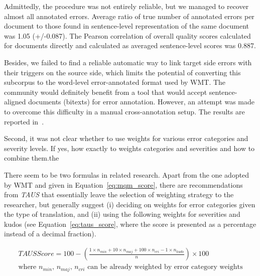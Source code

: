 Admittedly, the procedure was not entirely reliable, but we managed to recover almost all annotated errors. Average ratio of true number of annotated errors per document to those found in sentence-level representation of the same document was 1.05 (+/-0.087). The Pearson correlation of overall quality scores calculated for documents directly and calculated as averaged sentence-level scores was 0.887.

Besides, we failed to find a reliable automatic way to link target side errors with their triggers on the source side, which limits the potential of converting this subcorpus to the word-level error-annotated format used by WMT. 
The community would definitely benefit from a tool that would accept sentence-aligned documents (bitexts) for error annotation.  
However, an attempt was made to overcome this difficulty in a manual cross-annotation setup. The results are reported in~\citet{Kunilovskaya2022err}.

Second, it was not clear whether to use weights for various error categories and severity levels. If yes, how exactly to weights categories and severities and how to combine them.the 
 
There seem to be two formulas in related research. Apart from the one adopted by WMT and given in Equation~\ref{eq:mqm_score}, there are recommendations from \textit{TAUS} that essentially leave the selection of weighting strategy to the researcher, but generally suggest (i) deciding on weights for error categories given the type of translation, and (ii) using the following weights for severities and kudos (see Equation~\ref{eq:taus_score}, where the score is presented as a percentage instead of a decimal fraction).

\begin{equation}\label{eq:taus_score}
\begin{split}
TAUS Score = 100 - (\frac{1\times n_{min} + 10\times n_{maj} + 100\times n_{cri} -1\times n_{kudo}}{n})\times 100 \\
\text{where $n_{min}$, $n_{maj}$, $n_{cri}$ can be already weighted by error category weights} \\
\end{split}
\end{equation}

